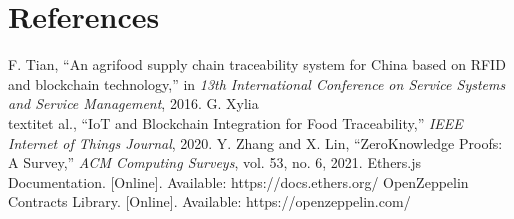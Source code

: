 \documentclass[conference]{IEEEtran}
\begin{document}
\section*{References}
\begin{thebibliography}{1}
 F. Tian, ``An agri\textendash food supply chain traceability system for China based on RFID and blockchain technology,'' in \textit{13th International Conference on Service Systems and Service Management}, 2016.
 G. Xylia \\textit{et al.}, ``IoT and Blockchain Integration for Food Traceability,'' \textit{IEEE Internet of Things Journal}, 2020.
 Y. Zhang and X. Lin, ``Zero\textendash Knowledge Proofs: A Survey,'' \textit{ACM Computing Surveys}, vol. 53, no. 6, 2021.
 Ethers.js Documentation. [Online]. Available: https://docs.ethers.org/
 OpenZeppelin Contracts Library. [Online]. Available: https://openzeppelin.com/
\end{thebibliography}
\end{document}
